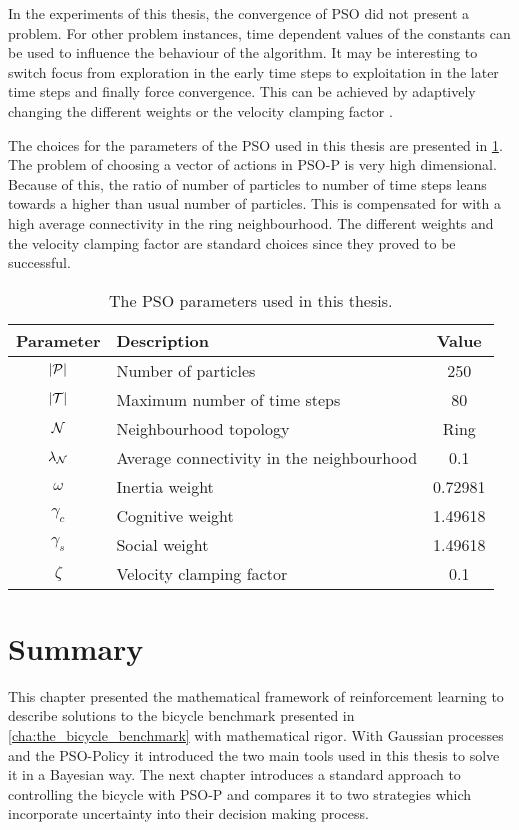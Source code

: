 In the experiments of this thesis, the convergence of PSO did not present a problem.
For other problem instances, time dependent values of the constants can be used to influence the behaviour of the algorithm.
It may be interesting to switch focus from exploration in the early time steps to exploitation in the later time steps and finally force convergence.
This can be achieved by adaptively changing the different weights or the velocity clamping factor \cite{engelbrecht_fundamentals_2006}.

The choices for the parameters of the PSO used in this thesis are presented in \cref{tab:pso_parameters}.
The problem of choosing a vector of actions in PSO-P is very high dimensional.
Because of this, the ratio of number of particles to number of time steps leans towards a higher than usual number of particles.
This is compensated for with a high average connectivity in the ring neighbourhood.
The different weights and the velocity clamping factor are standard choices since they proved to be successful.

\begin{table}[t]
    \centering
    \caption{The PSO parameters used in this thesis.}
    \label{tab:pso_parameters}
    \begin{tabularx}{\tablewidth}{cXc}
        \toprule
        Parameter & Description & Value \\
        \midrule
        $\abs{\Pe}$ & Number of particles & 250 \\
        $\vert\mathcal{T}\vert$ & Maximum number of time steps & 80 \\
        $\operatorname{\mathcal{N}}$ & Neighbourhood topology & Ring \\
        $\lambda_{\operatorname{\mathcal{N}}}$ & Average connectivity in the neighbourhood & 0.1 \\
        $\omega$ & Inertia weight & 0.72981 \\
        $\gamma_c$ & Cognitive weight & 1.49618 \\
        $\gamma_s$ & Social weight & 1.49618 \\
        $\zeta$ & Velocity clamping factor & 0.1 \\
        \bottomrule
    \end{tabularx}
\end{table}

\section{Summary}
This chapter presented the mathematical framework of reinforcement learning to describe solutions to the bicycle benchmark presented in \cref{cha:the_bicycle_benchmark} with mathematical rigor.
With Gaussian processes and the PSO-Policy it introduced the two main tools used in this thesis to solve it in a Bayesian way.
The next chapter introduces a standard approach to controlling the bicycle with PSO-P and compares it to two strategies which incorporate uncertainty into their decision making process.

